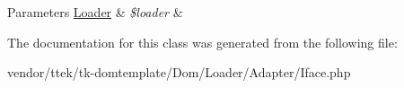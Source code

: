 \begin{DoxyParams}[1]{Parameters}
\hyperlink{classDom_1_1Loader}{Loader} & {\em \$loader} & \\
\hline
\end{DoxyParams}


The documentation for this class was generated from the following file\+:\begin{DoxyCompactItemize}
\item 
vendor/ttek/tk-\/domtemplate/\+Dom/\+Loader/\+Adapter/Iface.\+php\end{DoxyCompactItemize}
